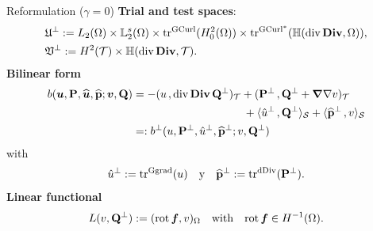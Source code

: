 \documentclass[10pt, compress]{beamer}
\begin{document}
\begin{frame}{Reformulation ($\gamma=0$) }
\textbf{Trial and test spaces}:
\begin{align*}
   &\UU^\perp:=L_2(\Omega)\times\LL_2^s(\Omega)\times 
   \tracegc{}(H^2_0(\Omega))\times \tra{}(\HdDiv{\Omega}) , \\ %
   &\VV^\perp:=H^2(\cT)\times\HdDiv{\cT}. %
\end{align*}
\textbf{Bilinear form}
\begin{align*} \label{b_Stokes}
   b(\bu,\PP,\tbu,\tPP;\bv,\QQ) %
   &=
   -\vdual{u}{\div\Div\QQ^\perp}_\cT + \vdual{\PP^\perp}{\QQ^\perp+\Grad\grad v}_\cT \nonumber \\
   & \hspace{10em} + \dual{\tu^\perp}{\QQ^\perp}_\cS + \dual{\tPP^\perp}{v}_\cS\nonumber\\
   &=: b^\perp(u,\PP^\perp,\tu^\perp,\tPP^\perp;v,\QQ^\perp) 
\end{align*}
with 
\[
   {\hat u}^\perp:=\mathrm{tr}_{}^{\mathrm{Ggrad}}(u) \quad\text{y}\quad \widehat{\mathbf{p}}^\perp:=\mathrm{tr}_{}^{\mathrm{dDiv}}(\mathbf{P}^\perp).
\]
\textbf{Linear functional }
\begin{align*}
    L(v,\mathbf{Q}^\perp) := ({\rm rot\,} \boldsymbol{f},v)_\Omega \quad \text{with} \quad {\rm rot\,} \boldsymbol{f} \in H^{-1}(\Omega). 
\end{align*}
\end{frame}
\end{document}
